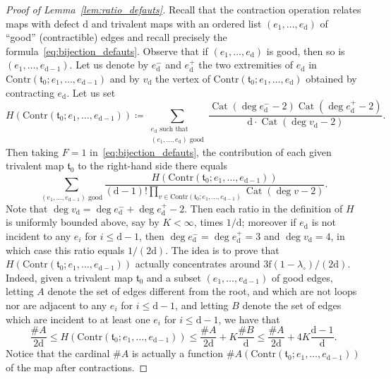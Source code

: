 \documentclass[10pt]{amsart}
\DeclareMathOperator{\Cat}{Cat}
\theoremstyle{plain}
\theoremstyle{definition}
\theoremstyle{remark}
\newcommand{\face}{\mathrm{f}}
\newcommand{\defect}{\mathrm{d}}
\begin{document}
\begin{proof}[Proof of Lemma~\ref{lem:ratio_defauts}]
Recall that the contraction operation relates maps with defect $\defect$ and trivalent maps with an ordered list $(e_1, \dots, e_\defect)$ of ``good'' (\ie contractible) edges and recall precisely the formula~\eqref{eq:bijection_defauts}.
Observe that if $(e_1, \dots, e_\defect)$ is good, then so is $(e_1, \dots, e_{\defect-1})$. Let us denote by $e_\defect^-$ and $e_\defect^+$ the two extremities of $e_\defect$ in $\mathrm{Contr}(\mathfrak{t}_0 ; e_1, \dots, e_{\defect-1})$ and by $v_\defect$ the vertex of $\mathrm{Contr}(\mathfrak{t}_0 ; e_1, \dots, e_\defect)$ obtained by contracting $e_\defect$.
Let us set
\[
H(\mathrm{Contr}(\mathfrak{t}_0 ; e_1, \dots, e_{ \defect-1}))
\coloneqq \sum_{\substack{e_\defect \text{ such that}\\ (e_1, \dots, e_\defect) \text{ good}}} \frac{\Cat(\deg e_\defect^- - 2) \Cat(\deg e_\defect^+ - 2)}{\defect\cdot\Cat(\deg v_\defect - 2)}.
\]
Then taking $F=1$ in~\eqref{eq:bijection_defauts}, the contribution of each given trivalent map $\mathfrak{t}_0$ to the right-hand side there equals
\[
\sum_{(e_1, \dots, e_{\defect-1}) \text{ good}} \frac{H(\mathrm{Contr}(\mathfrak{t}_0 ; e_1, \dots, e_{ \defect-1}))}{(\defect-1)! \prod_{v \in \mathrm{Contr}(\mathfrak{t}_0 ; e_1, \dots, e_{\defect-1})} \Cat(\deg v - 2)}.
\]
Note that $\deg v_\defect = \deg e_\defect^- + \deg e_\defect^+ - 2$. Then each ratio in the definition of $H$ is uniformly bounded above, say by $K < \infty$, times $1/\defect$; moreover if $e_\defect$ is not incident to any $e_i$ for $i \le \defect-1$, then $\deg e_\defect^- = \deg e_\defect^+ = 3$ and $\deg v_\defect = 4$, in which case this ratio equals $1/(2\defect)$. The idea is to prove that $H(\mathrm{Contr}(\mathfrak{t}_0 ; e_1, \dots, e_{ \defect-1}))$ actually concentrates around $3\face(1-\lambda_\circ) / (2\defect)$. Indeed, given a trivalent map $\mathfrak{t}_0$ and a subset $(e_1, \dots, e_{\defect-1})$ of good edges, letting $A$ denote the set of edges different from the root, and which are not loops nor are adjacent to any $e_i$ for $i \le \defect-1$, and letting $B$ denote the set of edges which are incident to at least one $e_i$ for $i \le \defect-1$,
we have that
\[
\frac{\# A}{2\defect}
\le H(\mathrm{Contr}(\mathfrak{t}_0 ; e_1, \dots, e_{ \defect-1}))
\le \frac{\# A}{2\defect} + K \frac{\# B}{\defect}
\le \frac{\# A}{2\defect} + 4 K \frac{\defect-1}{\defect}.
\]
Notice that the cardinal $\#A$ is actually a function $\#A(\mathrm{Contr}(\mathfrak{t}_0 ; e_1, \dots, e_{ \defect-1}))$ of the map after contractions.

\end{proof}
\end{document}
